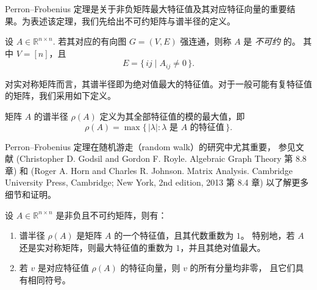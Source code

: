 Perron--Frobenius 定理是关于非负矩阵最大特征值及其对应特征向量的重要结果。为表述该定理，我们先给出不可约矩阵与谱半径的定义。

\begin{definition}[不可约矩阵]\label{def:irreducible}
设 $A\in \mathbb{R}^{n\times n}$. 若其对应的有向图 $G=(V,E)$ 强连通，则称 $A$ 是 \emph{不可约} 的。
其中 $V=[n]$，且
\[
E=\{\, ij \mid A_{ij}\neq 0 \,\}.
\]
\end{definition}

对实对称矩阵而言，其谱半径即为绝对值最大的特征值。对于一般可能有复特征值的矩阵，我们采用如下定义。

\begin{definition}[谱半径]\label{def:spectral-radius}
矩阵 $A$ 的谱半径 $\rho(A)$ 定义为其全部特征值的模的最大值，即
\[
\rho(A)=\max\{\, |\lambda| : \lambda \text{ 是 } A \text{ 的特征值} \,\}.
\]
\end{definition}

Perron--Frobenius 定理在随机游走（random walk）的研究中尤其重要，
参见文献 (Christopher D. Godsil and Gordon F. Royle. Algebraic Graph Theory 第 8.8 章) 和 (Roger A. Horn and Charles R. Johnson. Matrix Analysis. Cambridge University Press, Cambridge;
New York, 2nd edition, 2013 第 8.4 章) 以了解更多细节和证明。

\begin{theorem}\label{thm:PF}
设 $A\in \mathbb{R}^{n\times n}$ 是非负且不可约矩阵，则有：
\begin{enumerate}
    \item 谱半径 $\rho(A)$ 是矩阵 $A$ 的一个特征值，且其代数重数为 $1$。
    特别地，若 $A$ 还是实对称矩阵，则最大特征值的重数为 $1$，并且其绝对值最大。
    \item 若 $v$ 是对应特征值 $\rho(A)$ 的特征向量，则 $v$ 的所有分量均非零，
    且它们具有相同符号。
\end{enumerate}
\end{theorem}

